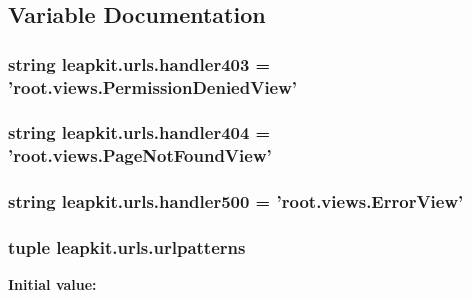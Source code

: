 \subsection{Variable Documentation}
\hypertarget{namespaceleapkit_1_1urls_a60e372c870f8ab648b60e9619948706b}{
\subsubsection[{handler403}]{\setlength{\rightskip}{0pt plus 5cm}string leapkit.\-urls.\-handler403 = '{\bf root.\-views.\-Permission\-Denied\-View}'}}\label{namespaceleapkit_1_1urls_a60e372c870f8ab648b60e9619948706b}
\hypertarget{namespaceleapkit_1_1urls_af1a0eb986cb54155d4520d380ae758f6}{
\subsubsection[{handler404}]{\setlength{\rightskip}{0pt plus 5cm}string leapkit.\-urls.\-handler404 = '{\bf root.\-views.\-Page\-Not\-Found\-View}'}}\label{namespaceleapkit_1_1urls_af1a0eb986cb54155d4520d380ae758f6}
\hypertarget{namespaceleapkit_1_1urls_a0dc67d39fc6d863ad9cb47a4b2e96cff}{
\subsubsection[{handler500}]{\setlength{\rightskip}{0pt plus 5cm}string leapkit.\-urls.\-handler500 = '{\bf root.\-views.\-Error\-View}'}}\label{namespaceleapkit_1_1urls_a0dc67d39fc6d863ad9cb47a4b2e96cff}
\hypertarget{namespaceleapkit_1_1urls_afa976c449da35d2fa63362f64ca3572c}{
\subsubsection[{urlpatterns}]{\setlength{\rightskip}{0pt plus 5cm}tuple leapkit.\-urls.\-urlpatterns}}\label{namespaceleapkit_1_1urls_afa976c449da35d2fa63362f64ca3572c}
{\bfseries Initial value\-:}
